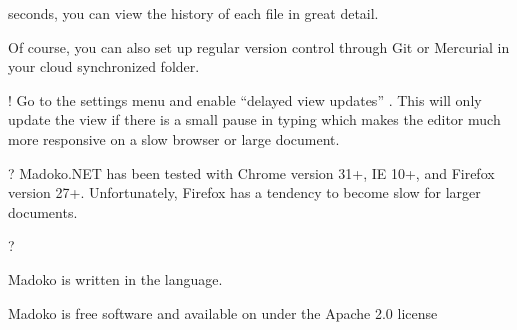 \documentclass{book}
\begin{document}
\begin{mdOl}[class={loose},data-line={79}]
\begin{mdLi}[data-line={109}]
\begin{mdP}[data-line={109}]
 seconds, you can view the history of each file in great detail.%
\end{mdP}%
\begin{mdP}[data-line={116}]%
{} Of course, you can also set up regular version control through Git
 or Mercurial in your cloud synchronized folder.%
\end{mdP}%
\end{mdLi}%
\begin{mdLi}[data-line={119}]%
\begin{mdP}[data-line={119}]%
{}%
{}!%
{}\mdBr
{} Go to the settings menu and enable %
{}{\textquotedblleft}delayed view updates{\textquotedblright}%
{}. This
 will only update the view if there is a small pause in typing which
 makes the editor much more responsive on a slow browser or large
 document.%
\end{mdP}%
\end{mdLi}%
\begin{mdLi}[data-line={125}]%
\begin{mdP}[data-line={125}]%
{}%
{}?%
{}\mdBr
{} Madoko.NET has been tested with Chrome version 31+, IE 10+, and
 Firefox version 27+. Unfortunately, Firefox has a tendency to
 become slow for larger documents.%
\end{mdP}%
\end{mdLi}%
\begin{mdLi}[data-line={130}]%
\begin{mdP}[data-line={130}]%
{}%
{}?%
{}{\mdNbsp}%
{} %
{}%
\end{mdP}%
\begin{mdUl}[class={list-dash,compact},data-line={131}]%
\begin{mdLi}[data-line={131}]%
{}%
{}%
\end{mdLi}%
\begin{mdLi}[data-line={132}]%
{}%
{}%
\end{mdLi}%
\begin{mdLi}[data-line={133}]%
{}Madoko is written in the%
{}{\mdNbsp}%
{} language.%
\end{mdLi}%
\begin{mdLi}[data-line={134}]%
{}Madoko is free software and available on%
{}{\mdNbsp}%
{} under the 
Apache 2.0 license%
\end{mdLi}%
\end{mdUl}%
\end{mdLi}%
\end{mdOl}%
\end{document}
